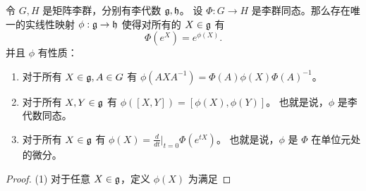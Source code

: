 \begin{theorem}\label{thm:homomorphism of lie groups induce homomorphism of lie algebras}
  令 $G,H$ 是矩阵李群，分别有李代数 $\mathfrak{g},\mathfrak{h}$。
  设 $\Phi:G\to H$ 是李群同态。那么存在唯一的实线性映射 $\phi:\mathfrak{g}\to\mathfrak{h}$
  使得对所有的 $X\in\mathfrak{g}$ 有
  \[
    \Phi(e^X)=e^{\phi(X)}.
  \]
  并且 $\phi$ 有性质：
  \begin{enumerate}
    \item 对于所有 $X\in\mathfrak{g},A\in G$ 有
    $\phi(AXA^{-1})=\Phi(A)\phi(X)\Phi(A)^{-1}$。
    \item 对于所有 $X,Y\in\mathfrak{g}$ 有 $\phi([X,Y])=[\phi(X),\phi(Y)]$。
    也就是说，$\phi$ 是李代数同态。
    \item 对于所有 $X\in\mathfrak{g}$ 有 $\phi(X)=\frac{d}{dt}\big|_{t=0}\Phi(e^{tX})$。
    也就是说，$\phi$ 是 $\Phi$ 在单位元处的微分。
  \end{enumerate}
\end{theorem}
\begin{proof}
  (1) 对于任意 $X\in\mathfrak{g}$，定义 $\phi(X)$ 为满足
\end{proof}




